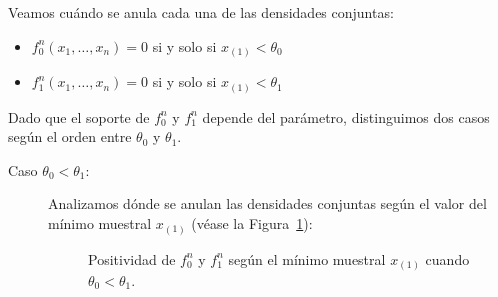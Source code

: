 \begin{ejercicio}
    Veamos cuándo se anula cada una de las densidades conjuntas:
    \begin{itemize}
        \item $f_0^n(x_1, \dots, x_n) = 0$ si y solo si $x_{(1)} < \theta_0$
        \item $f_1^n(x_1, \dots, x_n) = 0$ si y solo si $x_{(1)} < \theta_1$
    \end{itemize}

    Dado que el soporte de $f_0^n$ y $f_1^n$ depende del parámetro, distinguimos dos casos según el orden entre $\theta_0$ y $\theta_1$.

    \begin{description}
    \item[Caso $\theta_0 < \theta_1$:]

    Analizamos dónde se anulan las densidades conjuntas según el valor del mínimo muestral $x_{(1)}$ (véase la Figura~\ref{fig:soporte_caso1}):
    \begin{figure}[ht]
        \centering
        \caption{Positividad de $f_0^n$ y $f_1^n$ según el mínimo muestral $x_{(1)}$ cuando $\theta_0 < \theta_1$.}
        \label{fig:soporte_caso1}
    \end{figure}


\end{description}
\end{ejercicio}

